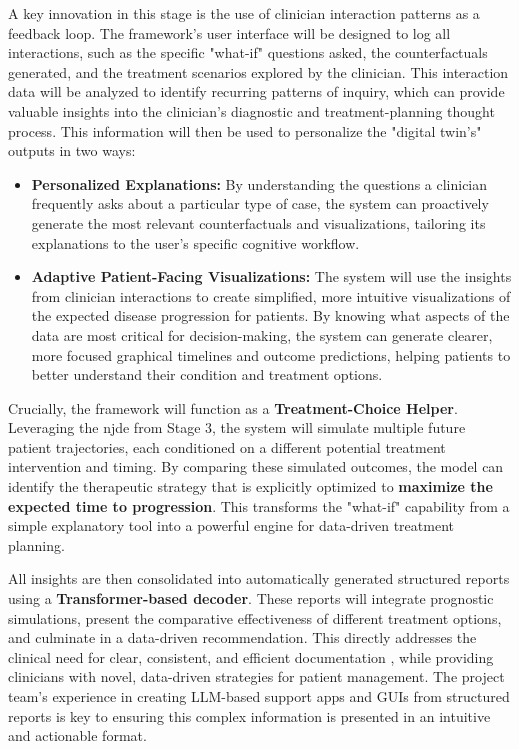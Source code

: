 \documentclass[11pt, a4paper]{article}
\begin{document}
A key innovation in this stage is the use of clinician interaction patterns as a feedback loop. The framework's user interface will be designed to log all interactions, such as the specific "what-if" questions asked, the counterfactuals generated, and the treatment scenarios explored by the clinician. This interaction data will be analyzed to identify recurring patterns of inquiry, which can provide valuable insights into the clinician's diagnostic and treatment-planning thought process. This information will then be used to personalize the "digital twin's" outputs in two ways:
\begin{itemize}
    \item \textbf{Personalized Explanations:} By understanding the questions a clinician frequently asks about a particular type of case, the system can proactively generate the most relevant counterfactuals and visualizations, tailoring its explanations to the user's specific cognitive workflow.
    \item \textbf{Adaptive Patient-Facing Visualizations:} The system will use the insights from clinician interactions to create simplified, more intuitive visualizations of the expected disease progression for patients. By knowing what aspects of the data are most critical for decision-making, the system can generate clearer, more focused graphical timelines and outcome predictions, helping patients to better understand their condition and treatment options.
\end{itemize}

Crucially, the framework will function as a \textbf{Treatment-Choice Helper}. Leveraging the \gls{njde} from Stage 3, the system will simulate multiple future patient trajectories, each conditioned on a different potential treatment intervention and timing. By comparing these simulated outcomes, the model can identify the therapeutic strategy that is explicitly optimized to \textbf{maximize the expected time to progression}. This transforms the "what-if" capability from a simple explanatory tool into a powerful engine for data-driven treatment planning.

All insights are then consolidated into automatically generated structured reports using a \textbf{Transformer-based decoder}. These reports will integrate prognostic simulations, present the comparative effectiveness of different treatment options, and culminate in a data-driven recommendation. This directly addresses the clinical need for clear, consistent, and efficient documentation \cite{JorgHalfmann2023, SacoranskyKwan2024}, while providing clinicians with novel, data-driven strategies for patient management. The project team's experience in creating LLM-based support apps and GUIs from structured reports is key to ensuring this complex information is presented in an intuitive and actionable format.
\end{document}
